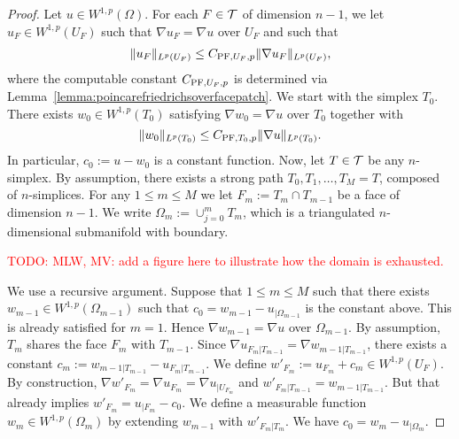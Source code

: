 \documentclass[12pt,a4paper]{article}
\newcommand{\todo}[1]{\textcolor{red}{TODO: #1}}
\begin{document}
\begin{proof}
 Let $u \in W^{1,p}(\Omega)$. 
 For each $F \in {\mathcal T}$ of dimension $n-1$, 
 we let $u_F \in W^{1,p}(U_F)$ such that $\nabla u_F = \nabla u$ over $U_F$ and such that 
 \begin{align*}
    \| u_F \|_{L^{p}(U_F)} \leq C_{{\rm{PF}},U_F,p} \| \nabla u_F \|_{L^{p}(U_F)},
 \end{align*}
 where the computable constant $C_{{\rm{PF}},U_F,p}$ is determined via Lemma~\ref{lemma:poincarefriedrichsoverfacepatch}.
 We start with the simplex $T_{0}$. 
 There exists $w_0 \in W^{1,p}(T_{0})$ satisfying $\nabla w_0 = \nabla u$ over $T_{0}$ together with 
 \[
    \| w_0 \|_{L^{p}(T_{0})} \leq C_{{\rm{PF}},T_{0},p} \| \nabla u \|_{L^{p}(T_{0})}.
 \]
 In particular, $c_{0} := u - w_0$ is a constant function. 
 Now, let $T \in {\mathcal T}$ be any $n$-simplex. 
 By assumption, there exists a strong path $T_0, T_1, \dots, T_M = T$, composed of $n$-simplices. 
 For any $1 \leq m \leq M$ we let $F_m := T_m \cap T_{m-1}$ be a face of dimension $n-1$. 
 We write $\Omega_m := \cup_{j=0}^{m} T_m$, which is a triangulated $n$-dimensional submanifold with boundary.
 
 
 \todo{MLW, MV: add a figure here to illustrate how the domain is exhausted.}
 
 We use a recursive argument. 
 Suppose that $1 \leq m \leq M$ such that there exists $w_{m-1} \in W^{1,p}(\Omega_{m-1})$ 
 such that $c_{0} = w_{m-1} - u_{|\Omega_{m-1}}$ is the constant above. 
 This is already satisfied for $m=1$.
 Hence $\nabla w_{m-1} = \nabla u$ over $\Omega_{m-1}$. 
 By assumption, $T_{m}$ shares the face $F_{m}$ with $T_{{m-1}}$. 
 Since $\nabla u_{F_{m}|T_{{m-1}}} = \nabla w_{m-1|T_{{m-1}}}$,
 there exists a constant $c_{m} := w_{m-1|T_{{m-1}}} - u_{F_{m}|T_{{m-1}}}$.
 We define $w'_{F_m} := u_{F_m} + c_{m} \in W^{1,p}(U_F)$.
 By construction, $\nabla w'_{F_m} = \nabla u_{F_m} = \nabla u_{|U_{F_m}}$ 
 and 
 $w'_{F_{m}|T_{{m-1}}} = w_{m-1|T_{{m-1}}}$. 
 But that already implies $w'_{F_m} = u_{|F_m} - c_{0}$. 
 We define a measurable function $w_{m} \in W^{1,p}(\Omega_m)$ by extending $w_{m-1}$ with $w'_{F_m|T_m}$.
 We have $c_{0} = w_{m} - u_{|\Omega_{m}}$. 
 

\end{proof}
\end{document}
